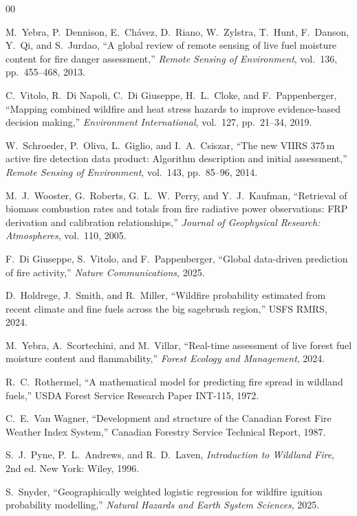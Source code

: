 \documentclass[conference]{IEEEtran}
\begin{document}
\begin{thebibliography}{00}

M.~Yebra, P.~Dennison, E.~Ch\'{a}vez, D.~Riano, W.~Zylstra, T.~Hunt, F.~Danson,
Y.~Qi, and S.~Jurdao, ``A global review of remote sensing of live fuel moisture
content for fire danger assessment,'' \textit{Remote Sensing of Environment},
vol.~136, pp.~455--468, 2013.

C.~Vitolo, R.~Di Napoli, C.~Di Giuseppe, H.~L.~Cloke, and F.~Pappenberger,
``Mapping combined wildfire and heat stress hazards to improve evidence-based
decision making,'' \textit{Environment International}, vol.~127,
pp.~21--34, 2019.

W.~Schroeder, P.~Oliva, L.~Giglio, and I.~A.~Csiszar, ``The new VIIRS 375\,m
active fire detection data product: Algorithm description and initial assessment,''
\textit{Remote Sensing of Environment}, vol.~143, pp.~85--96, 2014.

M.~J.~Wooster, G.~Roberts, G.~L.~W.~Perry, and Y.~J.~Kaufman, ``Retrieval of
biomass combustion rates and totals from fire radiative power observations: FRP
derivation and calibration relationships,'' \textit{Journal of Geophysical Research:
Atmospheres}, vol.~110, 2005.

F.~Di Giuseppe, S.~Vitolo, and F.~Pappenberger, ``Global data-driven prediction of
fire activity,'' \textit{Nature Communications}, 2025.

D.~Holdrege, J.~Smith, and R.~Miller, ``Wildfire probability estimated from recent
climate and fine fuels across the big sagebrush region,'' USFS RMRS, 2024.

M.~Yebra, A.~Scortechini, and M.~Villar, ``Real-time assessment of live forest fuel
moisture content and flammability,'' \textit{Forest Ecology and Management}, 2024.

R.~C.~Rothermel, ``A mathematical model for predicting fire spread in wildland fuels,''
USDA Forest Service Research Paper INT-115, 1972.

C.~E.~Van Wagner, ``Development and structure of the Canadian Forest Fire Weather
Index System,'' Canadian Forestry Service Technical Report, 1987.

S.~J.~Pyne, P.~L.~Andrews, and R.~D.~Laven, \textit{Introduction to Wildland Fire},
2nd ed. New York: Wiley, 1996.

S.~Snyder, ``Geographically weighted logistic regression for wildfire ignition
probability modelling,'' \textit{Natural Hazards and Earth System Sciences}, 2025.


\end{thebibliography}
\end{document}

